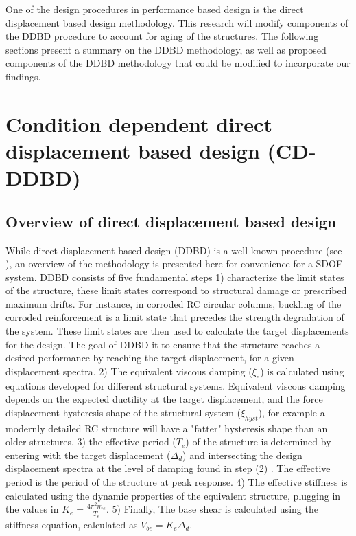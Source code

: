 One of the design procedures in performance  based design is the direct displacement based design methodology. This research will modify components of the DDBD procedure to account for aging of the structures. The following sections present a summary on the DDBD methodology, as well as proposed components of the DDBD methodology that could be modified to incorporate our findings.

\section{Condition dependent direct displacement based design (CD-DDBD)}
\subsection{Overview of direct displacement based design}

While direct displacement based design (DDBD) is a well known procedure (see \cite{Priestley2007}), an overview of the methodology is presented here for convenience for a SDOF system. DDBD consists of five fundamental steps 1) characterize the limit states of the structure, these limit states correspond to structural damage or prescribed maximum drifts. For instance, in corroded RC circular columns, buckling of the corroded reinforcement is a limit state that precedes the strength degradation of the system. These limit states are then used to calculate the target displacements for the design. The goal of DDBD it to ensure that the structure reaches a desired performance by reaching the target displacement, for a given displacement spectra.  2) The equivalent viscous damping ($\xi_e$) is calculated using equations developed for different structural systems. Equivalent viscous damping depends on the expected ductility at the target displacement, and the force displacement hysteresis shape of the structural system ($\xi_{hyst}$), for example a modernly detailed RC structure will have a "fatter" hysteresis shape than an older structures. 3)  the effective period ($T_e$) of the structure is determined by entering with the target displacement ($\Delta_d$) and intersecting the design displacement spectra at the level of damping found in step (2) . The effective period is  the period of the structure at peak response. 4) The effective stiffness is calculated using the dynamic properties of the equivalent structure, plugging in the values in $K_e=\frac{4\pi^{2}m_{e}}{T_{e}}$. 5) Finally, The base shear is calculated using the stiffness equation, calculated as $V_{be}=K_{e}\Delta_{d}$.

